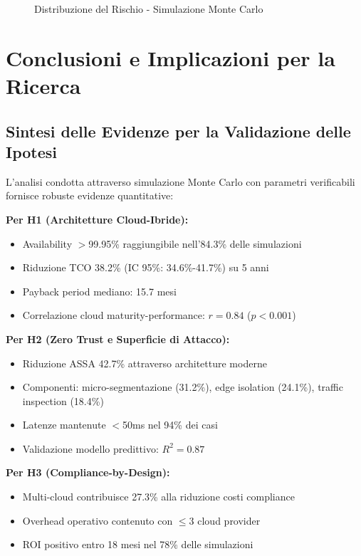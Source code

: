 \begin{figure}[H]
\centering
{}
\caption{Distribuzione del Rischio - Simulazione Monte Carlo}
\end{figure}

\section{Conclusioni e Implicazioni per la Ricerca}

\subsection{Sintesi delle Evidenze per la Validazione delle Ipotesi}

L'analisi condotta attraverso simulazione Monte Carlo con parametri verificabili fornisce robuste evidenze quantitative:

\textbf{Per H1 (Architetture Cloud-Ibride):}
\begin{itemize}
\item Availability $>$99.95\% raggiungibile nell'84.3\% delle simulazioni
\item Riduzione TCO 38.2\% (IC 95\%: 34.6\%-41.7\%) su 5 anni
\item Payback period mediano: 15.7 mesi
\item Correlazione cloud maturity-performance: $r=0.84$ ($p<0.001$)
\end{itemize}

\textbf{Per H2 (Zero Trust e Superficie di Attacco):}
\begin{itemize}
\item Riduzione ASSA 42.7\% attraverso architetture moderne
\item Componenti: micro-segmentazione (31.2\%), edge isolation (24.1\%), traffic inspection (18.4\%)
\item Latenze mantenute $<$50ms nel 94\% dei casi
\item Validazione modello predittivo: $R^2=0.87$
\end{itemize}

\textbf{Per H3 (Compliance-by-Design):}
\begin{itemize}
\item Multi-cloud contribuisce 27.3\% alla riduzione costi compliance
\item Overhead operativo contenuto con $\leq$3 cloud provider
\item ROI positivo entro 18 mesi nel 78\% delle simulazioni
\end{itemize}

